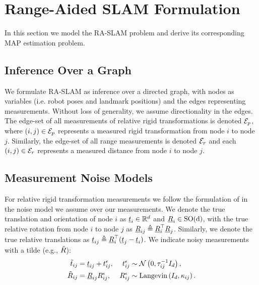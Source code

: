 \section{Range-Aided SLAM Formulation}

In this section we model the RA-SLAM problem and derive its
corresponding MAP estimation problem.

\subsection{Inference Over a Graph}

We formulate RA-SLAM as inference over a directed graph, with nodes as variables
(i.e. robot poses and landmark positions) and the edges representing
measurements. Without loss of generality, we assume directionality in the edges.
The edge-set of all measurements of relative rigid transformations is denoted
$\mathcal{E}_{p}$, where $(i,j) \in \mathcal{E}_{p}$ represents a measured
rigid transformation from node $i$ to node $j$. Similarly, the edge-set of all
range measurements is denoted $\mathcal{E}_{r}$ and each $(i,j) \in \mathcal{E}_{r}$
represents a measured distance from node $i$ to node $j$.

\subsection{Measurement Noise Models}
\label{sec:noise-models}

For relative rigid transformation measurements we follow the formulation of
\cite{rosen19ijrr} in the noise model we assume over our
measurements. We denote the true translation and orientation of node $i$ as
$\underline{t}_i \in \mathbb{R}^d$ and $\underline{R}_i \in \operatorname{{\operatorname{SO}}(d)}$, with the true relative rotation from node $i$ to node
$j$ as $\underline{R}_{ij} \triangleq \underline{R}_{i}^\top \underline{R}_{j}$. Similarly, we denote
the true relative translations as $\underline{t}_{ij} \triangleq \underline{R}_{i}^\top (
        \underline{t}_{j} - \underline{t}_{i} )$. We indicate noisy measurements with a tilde (e.g.,
$\tilde{R}$):
\begin{equation}
    \begin{aligned}
        \tilde{t}_{i j} & =\underline{t}_{i j}+{t}^{\epsilon}_{i j}, & {t}^{\epsilon}_{i j} & \sim \mathcal{N}\left(0, \tau_{i j}^{-1} I_{d}\right), \\
        \tilde{R}_{i j}  & =\underline{R}_{i j} {R}^{\epsilon}_{i j},   & {R}^{\epsilon}_{i j}  & \sim \operatorname{Langevin} \left(I_{d}, \kappa_{i j}\right).
    \end{aligned}
\end{equation}

